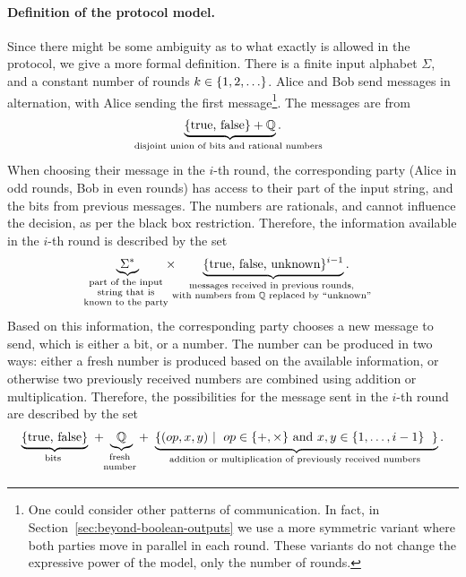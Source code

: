 \paragraph*{Definition of the protocol model.} Since there might be some ambiguity as to what exactly is allowed in the protocol, we give a more formal  definition. There is a finite input alphabet $\Sigma$, and a constant number of rounds $k \in \{1,2,\ldots\}$.   Alice and Bob send messages in alternation, with Alice sending the first message\footnote{One could consider other patterns of communication. In fact, in Section~\ref{sec:beyond-boolean-outputs} we use a more symmetric variant where both parties move in parallel in each round. These variants  do not change the expressive power of the model, only the  number of rounds.}. The messages are from 
\begin{align*}
\myunderbrace{\set{\text{true, false}} + \Rat}{disjoint union of bits and rational numbers}.
\end{align*}
When choosing their message in the $i$-th round, the corresponding  party (Alice in odd rounds, Bob in even rounds) has access to their part of the input string, and the  bits from previous messages. The numbers  are rationals, and cannot influence the decision, as per the black box restriction.  Therefore, the information available  in the $i$-th round is described by  the set 
\begin{align}\label{eq:strategy-input}
\myunderbrace{\Sigma^*}{part of the  input \\ string that is \\ known to the party}
\qquad \times \qquad 
\myunderbrace{\set{\text{true, false, unknown}}^{i-1}}{messages received in  previous rounds, \\ with  numbers from $\Rat$ replaced by ``unknown''}.
\end{align}
Based on this information, the corresponding party chooses a new message to  send, which is either a bit, or a number. The number can be produced in two ways: either  a  fresh number  is produced based on the available information, or otherwise two previously received numbers are combined using addition or multiplication.  Therefore, the possibilities for the message sent in the $i$-th round are described by the set 
\begin{align}
    \label{eq:strategy-output}
\myunderbrace{\set{\text{true, false}}}{bits}
\ + \ 
\myunderbrace{\Rat}{fresh \\ number}
\  + \ 
\myunderbrace{\setbuild{(op,x,y)}{$op \in \set{+,\times}$ and $x,y \in \set{1,\ldots,i-1}$}}{addition or multiplication of previously received numbers}.
\end{align}
